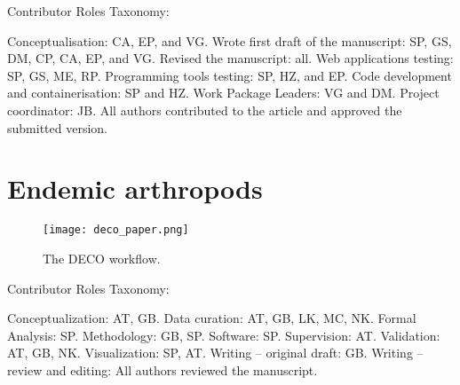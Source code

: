 Contributor Roles Taxonomy:

Conceptualisation: CA, EP, and VG.
Wrote first draft of the manuscript: SP, GS, DM, CP, CA, EP, and VG.
Revised the manuscript: all.
Web applications testing: SP, GS, ME, RP.
Programming tools testing: SP, HZ, and EP.
Code development and containerisation: SP and HZ.
Work Package Leaders: VG and DM.
Project coordinator: JB.
All authors contributed to the article and approved the submitted version.

\section{Endemic arthropods}

\begin{figure}[hbt!] 
    \centering\texttt{[image: deco\_paper.png]}
\caption{The DECO workflow.}
    \label{fig:deco_paper}
\end{figure}

Contributor Roles Taxonomy:

Conceptualization: AT, GB.
Data curation: AT, GB, LK, MC, NK.
Formal Analysis: SP.
Methodology: GB, SP.
Software: SP.
Supervision: AT.
Validation: AT, GB, NK.
Visualization: SP, AT.
Writing – original draft: GB.
Writing – review and editing: All authors reviewed the manuscript.

